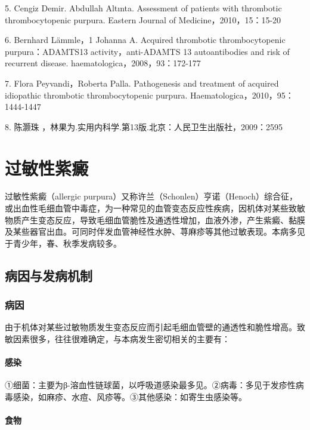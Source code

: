 5. Cengiz Demir. Abdullah Altınta. Assessment of patients with
thrombotic thrombocytopenic purpura. Eastern Journal of
Medicine，2010，15：15-20

6. Bernhard Lämmle，1 Johanna A. Acquired thrombotic thrombocytopenic
purpura：ADAMTS13 activity，anti-ADAMTS 13 autoantibodies and risk of
recurrent disease. haematologica，2008，93：172-177

7. Flora Peyvandi，Roberta Palla. Pathogenesis and treatment of acquired
idiopathic thrombotic thrombocytopenic purpura.
Haematologica，2010，95：1444-1447

8. 陈灏珠 ，林果为.实用内科学.第13版.北京：人民卫生出版社，2009：2595

\protect\hypertarget{text00335.html}{}{}

\section{过敏性紫癜}

过敏性紫癜（allergic
purpura）又称许兰（Schonlen）亨诺（Henoch）综合征，或出血性毛细血管中毒症，为一种常见的血管变态反应性疾病，因机体对某些致敏物质产生变态反应，导致毛细血管脆性及通透性增加，血液外渗，产生紫癜、黏膜及某些器官出血。可同时伴发血管神经性水肿、荨麻疹等其他过敏表现。本病多见于青少年，春、秋季发病较多。

\subsection{病因与发病机制}

\subsubsection{病因}

由于机体对某些过敏物质发生变态反应而引起毛细血管壁的通透性和脆性增高。致敏因素很多，往往很难确定，与本病发生密切相关的主要有：

\paragraph{感染}

①细菌：主要为β-溶血性链球菌，以呼吸道感染最多见。②病毒：多见于发疹性病毒感染，如麻疹、水痘、风疹等。③其他感染：如寄生虫感染等。

\paragraph{食物}

